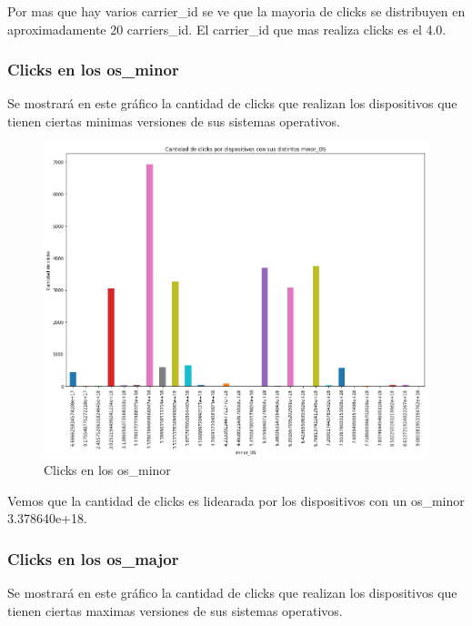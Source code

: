 \documentclass[a4paper, 12pt]{article}
\newcommand\tab[1][1cm]{\hspace*{#1}}
\begin{document}
		\tab Por mas que hay varios carrier\_id se ve que la mayoria de clicks se distribuyen en aproximadamente 20 carriers\_id. El carrier\_id que mas realiza clicks es el 4.0.

	\subsubsection{Clicks en los os\_minor}
		\tab Se mostrará en este gráfico la cantidad de clicks que realizan los dispositivos que tienen ciertas minimas versiones de sus sistemas operativos.

		\FloatBarrier
		\begin{figure}[h]
			\centering
			\includegraphics[scale = 0.37]{images/clicks/clicks_minor_OS.png}
			\caption{Clicks en los os\_minor}
		\end{figure}
		\FloatBarrier

		\tab Vemos que la cantidad de clicks es lidearada por los dispositivos con un os\_minor 3.378640e+18.

	\subsubsection{Clicks en los os\_major}
		\tab Se mostrará en este gráfico la cantidad de clicks que realizan los dispositivos que tienen ciertas maximas versiones de sus sistemas operativos.
\end{document}
